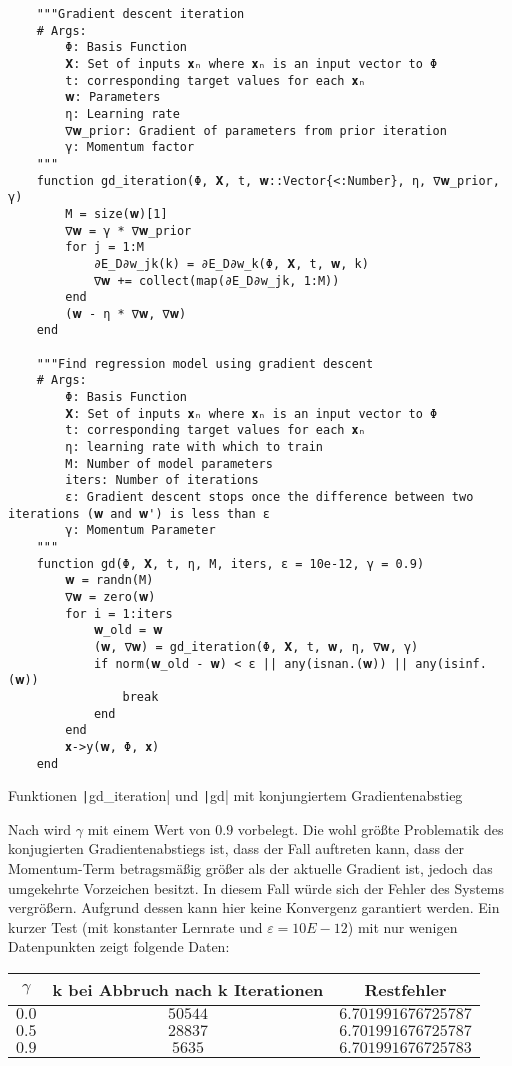 \documentclass{article}
\theoremstyle{plain} %
\theoremstyle{definition} %
\begin{document}
\begin{listing}[!ht]
  \begin{verbatim} 
    """Gradient descent iteration
    # Args:
        Φ: Basis Function
        𝐗: Set of inputs 𝐱ₙ where 𝐱ₙ is an input vector to Φ
        t: corresponding target values for each 𝐱ₙ
        𝐰: Parameters
        η: Learning rate
        ∇𝐰_prior: Gradient of parameters from prior iteration
        γ: Momentum factor
    """
    function gd_iteration(Φ, 𝐗, t, 𝐰::Vector{<:Number}, η, ∇𝐰_prior, γ)
        M = size(𝐰)[1]
        ∇𝐰 = γ * ∇𝐰_prior
        for j = 1:M
            ∂E_D∂w_jk(k) = ∂E_D∂w_k(Φ, 𝐗, t, 𝐰, k)
            ∇𝐰 += collect(map(∂E_D∂w_jk, 1:M))
        end
        (𝐰 - η * ∇𝐰, ∇𝐰)
    end

    """Find regression model using gradient descent
    # Args:
        Φ: Basis Function
        𝐗: Set of inputs 𝐱ₙ where 𝐱ₙ is an input vector to Φ
        t: corresponding target values for each 𝐱ₙ
        η: learning rate with which to train
        M: Number of model parameters
        iters: Number of iterations
        ε: Gradient descent stops once the difference between two iterations (𝐰 and 𝐰') is less than ε
        γ: Momentum Parameter
    """
    function gd(Φ, 𝐗, t, η, M, iters, ε = 10e-12, γ = 0.9)
        𝐰 = randn(M)
        ∇𝐰 = zero(𝐰)
        for i = 1:iters
            𝐰_old = 𝐰
            (𝐰, ∇𝐰) = gd_iteration(Φ, 𝐗, t, 𝐰, η, ∇𝐰, γ)
            if norm(𝐰_old - 𝐰) < ε || any(isnan.(𝐰)) || any(isinf.(𝐰))
                break
            end
        end
        𝐱->y(𝐰, Φ, 𝐱)
    end
  \end{verbatim}
  \caption{Funktionen \texttt|gd_iteration| und \texttt|gd| mit konjungiertem Gradientenabstieg}
  \label{listing:momentum}
\end{listing}

Nach \cite[S. 110]{Lippe} wird $\gamma$ mit einem Wert von $0.9$ vorbelegt. Die wohl größte Problematik des konjugierten Gradientenabstiegs ist, dass der Fall auftreten kann, dass der Momentum-Term betragsmäßig größer als der aktuelle Gradient ist, jedoch das umgekehrte Vorzeichen besitzt. In diesem Fall würde sich der Fehler des Systems vergrößern. Aufgrund dessen kann hier keine Konvergenz garantiert werden.
Ein kurzer Test (mit konstanter Lernrate und $\varepsilon=10E-12$) mit nur wenigen Datenpunkten zeigt folgende Daten:

\begin{tabular}{ccc}
  \toprule
  $\gamma$ & k bei Abbruch nach k Iterationen & Restfehler\\
  \midrule
  $0.0$ & $50544$ & $6.701991676725787$\\
  $0.5$ & $28837$ & $6.701991676725787$\\
  $0.9$ & $5635$ & $6.701991676725783$\\
\end{tabular}
\end{document}
